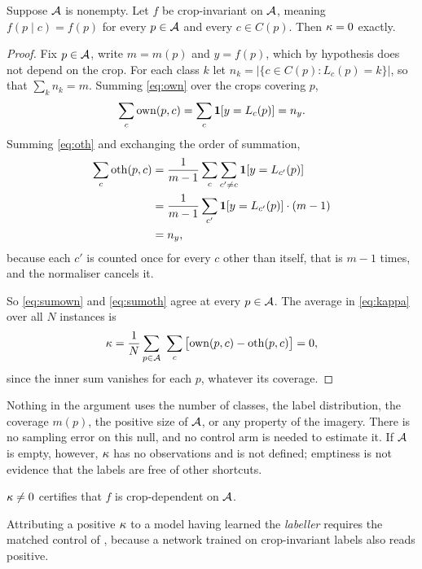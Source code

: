 \begin{proposition}
\label{prop:null}
Suppose $\mathcal{A}$ is nonempty. Let $f$ be crop-invariant on $\mathcal{A}$, meaning
$f(p \mid c) = f(p)$ for every
$p \in \mathcal{A}$ and every $c \in C(p)$. Then $\kappa = 0$ exactly.
\end{proposition}

\begin{proof}
Fix $p \in \mathcal{A}$, write $m = m(p)$ and $y = f(p)$, which by hypothesis does not depend
on the crop. For each class $k$ let $n_k = |\{ c \in C(p) : L_c(p) = k \}|$, so that
$\sum_k n_k = m$. Summing \cref{eq:own} over the crops covering $p$,
\begin{equation}
\sum_{c} \mathrm{own}(p,c) = \sum_{c} \mathbf{1}\!\left[ y = L_c(p) \right] = n_y .
\label{eq:sumown}
\end{equation}
Summing \cref{eq:oth} and exchanging the order of summation,
\begin{align}
\sum_{c} \mathrm{oth}(p,c)
  &= \frac{1}{m-1} \sum_{c} \sum_{c' \neq c} \mathbf{1}\!\left[ y = L_{c'}(p) \right] \nonumber \\
  &= \frac{1}{m-1} \sum_{c'} \mathbf{1}\!\left[ y = L_{c'}(p) \right] \cdot (m-1) \nonumber \\
  &= n_y ,
\label{eq:sumoth}
\end{align}
because each $c'$ is counted once for every $c$ other than itself, that is $m-1$
times, and the normaliser cancels it.

So \cref{eq:sumown} and \cref{eq:sumoth} agree at every $p \in \mathcal{A}$. The average in
\cref{eq:kappa} over all $N$ instances is
\begin{equation}
\kappa = \frac{1}{N} \sum_{p \in \mathcal{A}} \ \sum_{c} \big[ \mathrm{own}(p,c) - \mathrm{oth}(p,c) \big] = 0,
\end{equation}
since the inner sum vanishes for each $p$, whatever its coverage.
\end{proof}

Nothing in the argument uses the number of classes, the label distribution, the
coverage $m(p)$, the positive size of $\mathcal{A}$, or any property of the imagery. There is
no sampling error on this null, and no control arm is needed to estimate it. If
$\mathcal{A}$ is empty, however, $\kappa$ has no observations and is not defined; emptiness is
not evidence that the labels are free of other shortcuts.

\begin{corollary}
\label{cor:dep}
$\kappa \neq 0$ certifies that $f$ is crop-dependent on $\mathcal{A}$.
\end{corollary}

Attributing a positive $\kappa$ to a model having learned the \emph{labeller} requires
the matched control of , because a network trained on
crop-invariant labels also reads positive.

